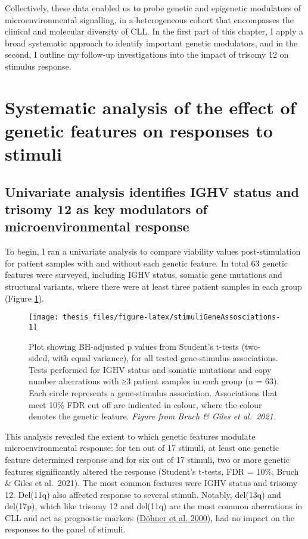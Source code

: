 \documentclass[11pt, a4paper, twosided]{book}
\begin{document}
Collectively, these data enabled us to probe genetic and epigenetic modulators of microenvironmental signalling, in a heterogeneous cohort that encompasses the clinical and molecular diversity of CLL. In the first part of this chapter, I apply a broad systematic approach to identify important genetic modulators, and in the second, I outline my follow-up investigations into the impact of trisomy 12 on stimulus response.

\hypertarget{systematic-analysis-of-the-effect-of-genetic-features-on-responses-to-stimuli}{%
\section{Systematic analysis of the effect of genetic features on responses to stimuli}\label{systematic-analysis-of-the-effect-of-genetic-features-on-responses-to-stimuli}}

\hypertarget{univariate-gene-stimulus-assosciations}{%
\subsection{Univariate analysis identifies IGHV status and trisomy 12 as key modulators of microenvironmental response}\label{univariate-gene-stimulus-assosciations}}

To begin, I ran a univariate analysis to compare viability values post-stimulation for patient samples with and without each genetic feature. In total 63 genetic features were surveyed, including IGHV status, somatic gene mutations and structural variants, where there were at least three patient samples in each group (Figure \ref{fig:stimuliGeneAssosciations}).


\begin{figure}

{\centering \texttt{[image: thesis\_files/figure-latex/stimuliGeneAssosciations-1]} 

}

\caption{Plot showing BH-adjusted p values from Student's t-tests (two-sided, with equal variance), for all tested gene-stimulus associations. Tests performed for IGHV status and somatic mutations and copy number aberrations with ≥3 patient samples in each group (n = 63). Each circle represents a gene-stimulus association. Associations that meet 10\% FDR cut off are indicated in colour, where the colour denotes the genetic feature. \emph{Figure from Bruch \& Giles et al.~2021.}}\label{fig:stimuliGeneAssosciations}
\end{figure}
This analysis revealed the extent to which genetic features modulate microenvironmental response: for ten out of 17 stimuli, at least one genetic feature determined response and for six out of 17 stimuli, two or more genetic features significantly altered the response (Student's t-tests, FDR = 10\%, Bruch \& Giles et al.~2021). The most common features were IGHV status and trisomy 12. Del(11q) also affected response to several stimuli. Notably, del(13q) and del(17p), which like trisomy 12 and del(11q) are the most common aberrations in CLL and act as prognostic markers (\protect\hyperlink{ref-Dohner2000}{Döhner et al. 2000}), had no impact on the responses to the panel of stimuli.
\end{document}
